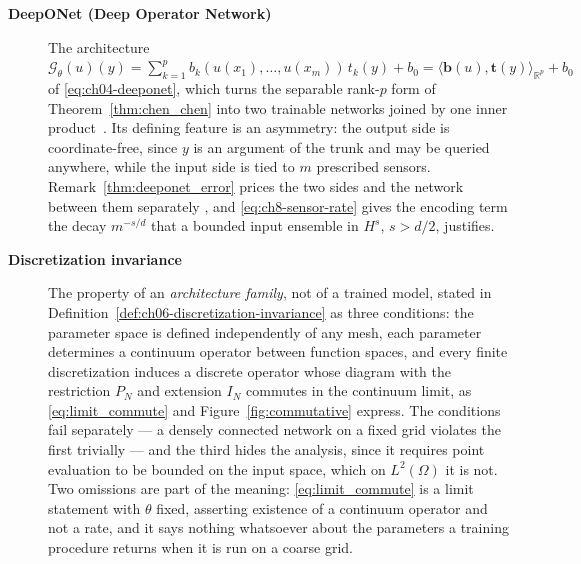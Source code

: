 \begin{description}
\item[\textbf{DeepONet (Deep Operator Network)}] The architecture
$\mathcal{G}_{\theta}(u)(y) = \sum_{k=1}^{p} b_{k}(u(x_{1}), \dots,
\allowbreak u(x_{m}))\,\allowbreak t_{k}(y) + b_{0} = \langle \mathbf{b}(u),
\allowbreak \mathbf{t}(y)\rangle_{\mathbb{R}^{p}}\allowbreak + b_{0}$ of \eqref{eq:ch04-deeponet},
which turns the separable rank-$p$ form of
Theorem~\ref{thm:chen_chen} into two trainable networks joined by one inner
product~\cite{lu2021learning}. Its defining feature is an asymmetry: the output side
is coordinate-free, since $y$ is an argument of the trunk and may be queried anywhere,
while the input side is tied to $m$ prescribed sensors. Remark~\ref{thm:deeponet_error}
prices the two sides and the network between them separately
\cite{lanthaler2022error}, and \eqref{eq:ch8-sensor-rate} gives the encoding term the
decay $m^{-s/d}$ that a bounded input ensemble in $H^{s}$, $s > d/2$, justifies.

\item[\textbf{Discretization invariance}] The property of an \emph{architecture
family}, not of a trained model, stated in Definition~\ref{def:ch06-discretization-invariance}
as three conditions: the parameter space is defined independently of any mesh, each
parameter determines a continuum operator between function spaces, and every finite
discretization induces a discrete operator whose diagram with the restriction
$P_N$ and extension $I_N$ commutes in the continuum limit, as
\eqref{eq:limit_commute} and Figure~\ref{fig:commutative} express. The conditions
fail separately --- a densely connected network on a fixed grid violates the first
trivially --- and the third hides the analysis, since it requires point evaluation to
be bounded on the input space, which on $L^{2}(\Omega)$ it is not. Two omissions are
part of the meaning: \eqref{eq:limit_commute} is a limit statement with $\theta$
fixed, asserting existence of a continuum operator and not a rate, and it says
nothing whatsoever about the parameters a training procedure returns when it is run
on a coarse grid. 


\end{description}

